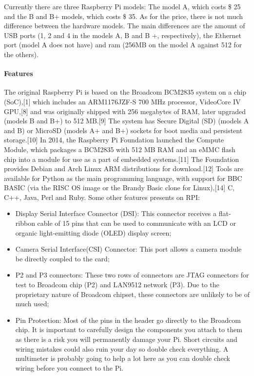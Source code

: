 \documentclass{acm_proc_article-sp}
\begin{document}
\newline
\newline
Currently there are three  Raspberry Pi models: The model A, which costs \$ 25 and the B and B+ models, which costs \$ 35. As for the price, there is not much difference between the hardware models. The main differences are the amount of USB ports (1, 2 and 4 in the models A, B and B +, respectively), the Ethernet port (model A does not have) and ram (256MB on the model A against 512 for the others).

\paragraph{Features}
The original Raspberry Pi is based on the Broadcom BCM2835 system on a chip (SoC),[1] which includes an ARM1176JZF-S 700 MHz processor, VideoCore IV GPU,[8] and was originally shipped with 256 megabytes of RAM, later upgraded (models B and B+) to 512 MB.[9] The system has Secure Digital (SD) (models A and B) or MicroSD (models A+ and B+) sockets for boot media and persistent storage.[10]
\newline
\newline
In 2014, the Raspberry Pi Foundation launched the Compute Module, which packages a BCM2835 with 512 MB RAM and an eMMC flash chip into a module for use as a part of embedded systems.[11]
The Foundation provides Debian and Arch Linux ARM distributions for download.[12] Tools are available for Python as the main programming language, with support for BBC BASIC (via the RISC OS image or the Brandy Basic clone for Linux),[14] C, C++, Java, Perl and Ruby.
\newline
\newline
Some other features presents on RPI:
\begin{itemize}
\item Display Serial Interface Connector (DSI): This connector receives a flat-ribbon cable of 15 pins that can be used to communicate with an LCD or organic light-emitting diode (OLED) display screen;	
\item Camera Serial Interface(CSI) Connector: This port allows a camera module be directly coupled to the card;
\item P2 and P3 connectors: These two rows of connectors are JTAG connectors for test to Broadcom chip (P2) and LAN9512 network (P3). Due to the proprietary nature of Broadcom chipset, these connectors are unlikely to be of much used;
\item Pin Protection: Most of the pins in the header go directly to the Broadcom chip. It is important to carefully design the components you attach to them as there is a risk you will permanently damage your Pi. Short circuits and wiring mistakes could also ruin your day so double check everything. A multimeter is probably going to help a lot here as you can double check wiring before you connect to the Pi.
\end{itemize}
\end{document}
